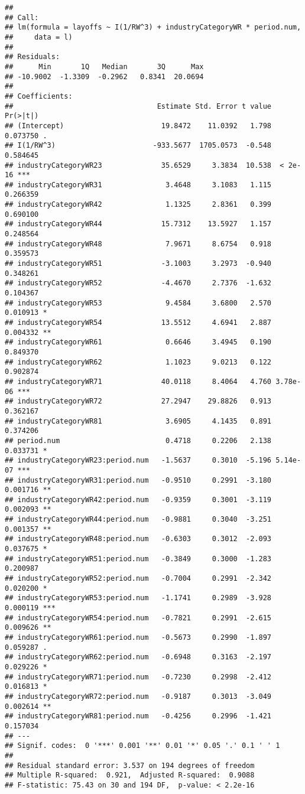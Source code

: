 \documentclass[
]{article}
\begin{document}
\begin{verbatim}
## 
## Call:
## lm(formula = layoffs ~ I(1/RW^3) + industryCategoryWR * period.num, 
##     data = l)
## 
## Residuals:
##      Min       1Q   Median       3Q      Max 
## -10.9002  -1.3309  -0.2962   0.8341  20.0694 
## 
## Coefficients:
##                                  Estimate Std. Error t value Pr(>|t|)    
## (Intercept)                       19.8472    11.0392   1.798 0.073750 .  
## I(1/RW^3)                       -933.5677  1705.0573  -0.548 0.584645    
## industryCategoryWR23              35.6529     3.3834  10.538  < 2e-16 ***
## industryCategoryWR31               3.4648     3.1083   1.115 0.266359    
## industryCategoryWR42               1.1325     2.8361   0.399 0.690100    
## industryCategoryWR44              15.7312    13.5927   1.157 0.248564    
## industryCategoryWR48               7.9671     8.6754   0.918 0.359573    
## industryCategoryWR51              -3.1003     3.2973  -0.940 0.348261    
## industryCategoryWR52              -4.4670     2.7376  -1.632 0.104367    
## industryCategoryWR53               9.4584     3.6800   2.570 0.010913 *  
## industryCategoryWR54              13.5512     4.6941   2.887 0.004332 ** 
## industryCategoryWR61               0.6646     3.4945   0.190 0.849370    
## industryCategoryWR62               1.1023     9.0213   0.122 0.902874    
## industryCategoryWR71              40.0118     8.4064   4.760 3.78e-06 ***
## industryCategoryWR72              27.2947    29.8826   0.913 0.362167    
## industryCategoryWR81               3.6905     4.1435   0.891 0.374206    
## period.num                         0.4718     0.2206   2.138 0.033731 *  
## industryCategoryWR23:period.num   -1.5637     0.3010  -5.196 5.14e-07 ***
## industryCategoryWR31:period.num   -0.9510     0.2991  -3.180 0.001716 ** 
## industryCategoryWR42:period.num   -0.9359     0.3001  -3.119 0.002093 ** 
## industryCategoryWR44:period.num   -0.9881     0.3040  -3.251 0.001357 ** 
## industryCategoryWR48:period.num   -0.6303     0.3012  -2.093 0.037675 *  
## industryCategoryWR51:period.num   -0.3849     0.3000  -1.283 0.200987    
## industryCategoryWR52:period.num   -0.7004     0.2991  -2.342 0.020200 *  
## industryCategoryWR53:period.num   -1.1741     0.2989  -3.928 0.000119 ***
## industryCategoryWR54:period.num   -0.7821     0.2991  -2.615 0.009626 ** 
## industryCategoryWR61:period.num   -0.5673     0.2990  -1.897 0.059287 .  
## industryCategoryWR62:period.num   -0.6948     0.3163  -2.197 0.029226 *  
## industryCategoryWR71:period.num   -0.7230     0.2998  -2.412 0.016813 *  
## industryCategoryWR72:period.num   -0.9187     0.3013  -3.049 0.002614 ** 
## industryCategoryWR81:period.num   -0.4256     0.2996  -1.421 0.157034    
## ---
## Signif. codes:  0 '***' 0.001 '**' 0.01 '*' 0.05 '.' 0.1 ' ' 1
## 
## Residual standard error: 3.537 on 194 degrees of freedom
## Multiple R-squared:  0.921,  Adjusted R-squared:  0.9088 
## F-statistic: 75.43 on 30 and 194 DF,  p-value: < 2.2e-16
\end{verbatim}
\end{document}
